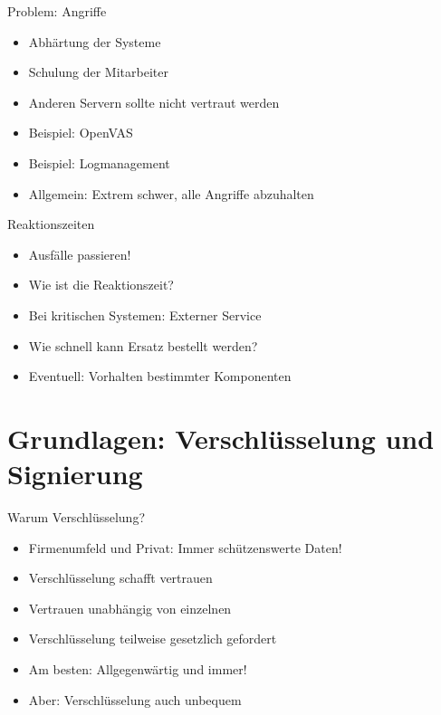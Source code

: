 \documentclass[10pt]{beamer}
\begin{document}
%
%
\begin{frame}[fragile]{Problem: Angriffe}
	\begin{itemize}
		\item Abhärtung der Systeme
		\item Schulung der Mitarbeiter
		\item Anderen Servern sollte nicht vertraut werden
		\item Beispiel: OpenVAS
		\item Beispiel: Logmanagement
		\item Allgemein: Extrem schwer, alle Angriffe abzuhalten
\end{itemize}
\end{frame}

%
%
\begin{frame}[fragile]{Reaktionszeiten}
	\begin{itemize}
	\item Ausfälle passieren!
\item Wie ist die Reaktionszeit?
\item Bei kritischen Systemen: Externer Service
\item Wie schnell kann Ersatz bestellt werden?
\item Eventuell: Vorhalten bestimmter Komponenten
\end{itemize}
\end{frame}

\section{Grundlagen: Verschlüsselung und Signierung}

%
%
\begin{frame}[fragile]{Warum Verschlüsselung?}
	\begin{itemize}
	\item Firmenumfeld und Privat: Immer schützenswerte Daten!
	\item Verschlüsselung schafft vertrauen
	\item Vertrauen unabhängig von einzelnen
	\item Verschlüsselung teilweise gesetzlich gefordert
	\item Am besten: Allgegenwärtig und immer!
	\item Aber: Verschlüsselung auch unbequem
\end{itemize}
\end{frame}
\end{document}
